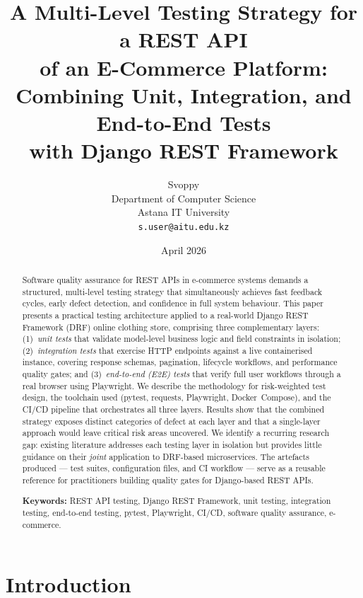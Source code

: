 \documentclass[12pt, a4paper]{article}
\title{%
    \textbf{A Multi-Level Testing Strategy for a REST API\\
    of an E-Commerce Platform:\\
    Combining Unit, Integration, and End-to-End Tests\\
    with Django REST Framework}%
}
\author{%
    Svoppy\\[4pt]
    \small Department of Computer Science\\
    \small Astana IT University\\[4pt]
    \small \texttt{s.user@aitu.edu.kz}
}
\date{April 2026}
\begin{document}
\maketitle
\thispagestyle{empty}

\begin{abstract}
\noindent
Software quality assurance for REST APIs in e-commerce systems demands a
structured, multi-level testing strategy that simultaneously achieves fast
feedback cycles, early defect detection, and confidence in full system
behaviour.  This paper presents a practical testing architecture applied to a
real-world Django REST Framework (DRF) online clothing store, comprising three
complementary layers: (1)~\textit{unit tests} that validate model-level business
logic and field constraints in isolation; (2)~\textit{integration tests} that
exercise HTTP endpoints against a live containerised instance, covering response
schemas, pagination, lifecycle workflows, and performance quality gates; and
(3)~\textit{end-to-end (E2E) tests} that verify full user workflows through a
real browser using Playwright.  We describe the methodology for risk-weighted
test design, the toolchain used (pytest, requests, Playwright, Docker~Compose),
and the CI/CD pipeline that orchestrates all three layers.  Results show that the
combined strategy exposes distinct categories of defect at each layer and that a
single-layer approach would leave critical risk areas uncovered.  We identify a
recurring research gap: existing literature addresses each testing layer in
isolation but provides little guidance on their \textit{joint} application to
DRF-based microservices.  The artefacts produced — test suites, configuration
files, and CI workflow — serve as a reusable reference for practitioners building
quality gates for Django-based REST APIs.

\medskip
\noindent\textbf{Keywords:} REST API testing, Django REST Framework, unit
testing, integration testing, end-to-end testing, pytest, Playwright, CI/CD,
software quality assurance, e-commerce.
\end{abstract}

\newpage
\tableofcontents
\newpage

\section{Introduction}
\label{sec:introduction}
\end{document}
